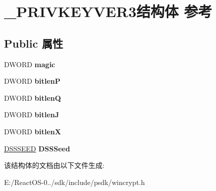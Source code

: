 \hypertarget{struct___p_r_i_v_k_e_y_v_e_r3}{}\section{\+\_\+\+P\+R\+I\+V\+K\+E\+Y\+V\+E\+R3结构体 参考}
\label{struct___p_r_i_v_k_e_y_v_e_r3}
\subsection*{Public 属性}
\begin{DoxyCompactItemize}
\item 
\mbox{\label{struct___p_r_i_v_k_e_y_v_e_r3_a4066fdf02eec7b2e0fc44ac4254cfa59}} 
D\+W\+O\+RD {\bfseries magic}
\item 
\mbox{\label{struct___p_r_i_v_k_e_y_v_e_r3_a2bf97f7c6371e2c05bd339d403561db2}} 
D\+W\+O\+RD {\bfseries bitlenP}
\item 
\mbox{\label{struct___p_r_i_v_k_e_y_v_e_r3_a98d1b20225b6b7e948db769a61fd5eb3}} 
D\+W\+O\+RD {\bfseries bitlenQ}
\item 
\mbox{\label{struct___p_r_i_v_k_e_y_v_e_r3_abfde7cddb2e226cc73e9d1c6bfaf893e}} 
D\+W\+O\+RD {\bfseries bitlenJ}
\item 
\mbox{\label{struct___p_r_i_v_k_e_y_v_e_r3_a952cd19cfc8f65ed489f01e39c122a89}} 
D\+W\+O\+RD {\bfseries bitlenX}
\item 
\mbox{\label{struct___p_r_i_v_k_e_y_v_e_r3_a6e5ec00dd71be429317c7cdcd14cdd92}} 
\hyperlink{struct___d_s_s_s_e_e_d}{D\+S\+S\+S\+E\+ED} {\bfseries D\+S\+S\+Seed}
\end{DoxyCompactItemize}


该结构体的文档由以下文件生成\+:\begin{DoxyCompactItemize}
\item 
E\+:/\+React\+O\+S-\/0../sdk/include/psdk/wincrypt.\+h\end{DoxyCompactItemize}
